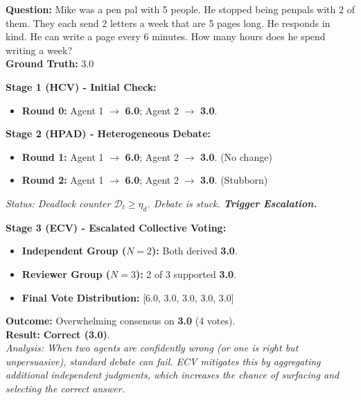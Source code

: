\documentclass[11pt]{article}
\begin{document}
\begin{tcolorbox}[
    enhanced, breakable, width=\linewidth,
    colback=red!5, colframe=red!40!black, %
    title=\textbf{Case 5: Deadlock Resolution (Stalemate) - GSM8K ID 242},
    fonttitle=\bfseries\small
]
\textbf{Question:}
Mike was a pen pal with 5 people.  He stopped being penpals with 2 of them.  They each send 2 letters a week that are 5 pages long.  He responds in kind.  He can write a page every 6 minutes.  How many hours does he spend writing a week?\\
\textbf{Ground Truth:} 3.0

\vspace{4pt}
\textbf{Stage 1 (HCV) - Initial Check:}
\begin{itemize}[leftmargin=1.5em, nosep]
    \item \textbf{Round 0:} Agent 1 $\to$ \textbf{6.0}; Agent 2 $\to$ \textbf{3.0}.
\end{itemize}

\vspace{4pt}
\textbf{Stage 2 (HPAD) - Heterogeneous Debate:}
\begin{itemize}[leftmargin=1.5em, nosep]
    \item \textbf{Round 1:} Agent 1 $\to$ \textbf{6.0}; Agent 2 $\to$ \textbf{3.0}. (No change)
    \item \textbf{Round 2:} Agent 1 $\to$ \textbf{6.0}; Agent 2 $\to$ \textbf{3.0}. (Stubborn)
\end{itemize}
\textit{Status: Deadlock counter $\mathcal{D}_t \ge \eta_d$. Debate is stuck. \textbf{Trigger Escalation.}}

\vspace{4pt}
\textbf{Stage 3 (ECV) - Escalated Collective Voting:}
\begin{itemize}[leftmargin=1.5em, nosep]
    \item \textbf{Independent Group ($N=2$):} Both derived \textbf{3.0}.
    \item \textbf{Reviewer Group ($N=3$):} 2 of 3 supported \textbf{3.0}.
    \item \textbf{Final Vote Distribution:} [6.0, 3.0, 3.0, 3.0, 3.0]
\end{itemize}

\vspace{4pt}
\textbf{Outcome:} Overwhelming consensus on \textbf{3.0} (4 votes). \\
\textbf{Result:} \textcolor{green!60!black}{\textbf{Correct (3.0)}}. \\
\textit{Analysis: When two agents are confidently wrong (or one is right but unpersuasive), standard debate can fail. ECV mitigates this by aggregating additional independent judgments, which increases the chance of surfacing and selecting the correct answer.}
\end{tcolorbox}
\end{document}
